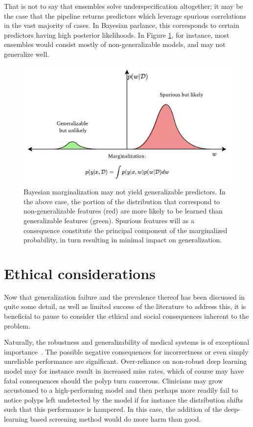 That is not to say that ensembles solve underspecification altogether; it may be the case that the pipeline returns predictors which leverage spurious correlations in the vast majority of cases. In Bayesian parlance, this corresponds to certain predictors having high posterior likelihoods. In Figure \ref{fig:bayesian_generalization}, for instance, most ensembles would consist mostly of non-generalizable models, and may not generalize well. 
\begin{figure}
    \centering
    \includegraphics[width=\linewidth]{illustrations/bayesian.png}
    \caption[Bayesian Marginalization and Generalization]{Bayesian marginalization may not yield generalizable predictors. In the above case, the portion of the distribution that correspond to non-generalizable features (red) are more likely to be learned than generalizable features (green). Spurious features will as a consequence constitute the principal component of the marginalized probability, in turn resulting in minimal impact on generalization.}
    \label{fig:bayesian_generalization}
\end{figure}

\section{Ethical considerations}\label{ethics}
    Now that generalization failure and the prevalence thereof has been discussed in quite some detail, as well as limited success of the literature to address this, it is beneficial to pause to consider the ethical and social consequences inherent to the problem. 
    
    Naturally, the robustness and generalizability of medical systems is of exceptional importance~\cite{ethics_1}. The possible negative consequences for incorrectness or even simply unreliable performance are significant. Over-reliance on non-robust deep learning model may for instance result in increased miss rates, which of course may have fatal consequences should the polyp turn cancerous. Clinicians may grow accustomed to a high-performing model and then perhaps more readily fail to notice polyps left undetected by the model if for instance the distribution shifts such that this performance is hampered. In this case, the addition of the deep-learning based screening method would do more harm than good.
    
